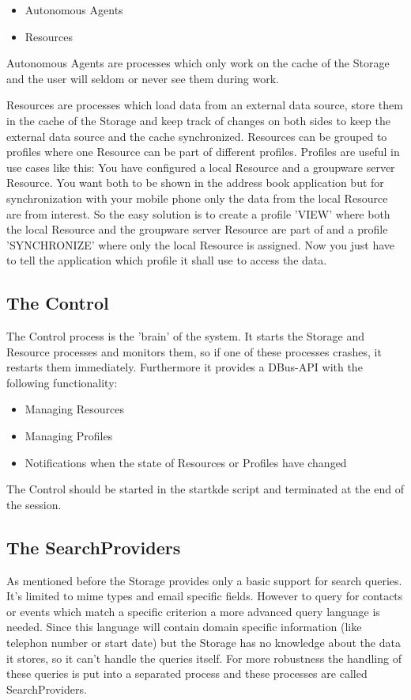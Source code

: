 \documentclass[]{report}
\begin{document}
\begin{itemize}
  \item Autonomous Agents
  \item Resources
\end{itemize}

Autonomous Agents are processes which only work on the cache of the Storage
and the user will seldom or never see them during work.

Resources are processes which load data from an external data source, store them
in the cache of the Storage and keep track of changes on both sides to keep
the external data source and the cache synchronized.
Resources can be grouped to profiles where one Resource can be part of different
profiles. Profiles are useful in use cases like this:
You have configured a local Resource and a groupware server Resource. You want both
to be shown in the address book application but for synchronization with your mobile
phone only the data from the local Resource are from interest. So the easy solution
is to create a profile 'VIEW' where both the local Resource and the groupware server
Resource are part of and a profile 'SYNCHRONIZE' where only the local Resource is
assigned. Now you just have to tell the application which profile it shall use to
access the data.

\subsection{The Control}
The Control process is the 'brain' of the system. It starts the Storage and Resource
processes and monitors them, so if one of these processes crashes, it restarts them immediately.
Furthermore it provides a DBus-API with the following functionality:

\begin{itemize}
  \item Managing Resources
  \item Managing Profiles
  \item Notifications when the state of Resources or Profiles have changed
\end{itemize}

The Control should be started in the startkde script and terminated at the end of the session.

\subsection{The SearchProviders}
As mentioned before the Storage provides only a basic support for search queries. It's limited
to mime types and email specific fields. However to query for contacts or events which match
a specific criterion a more advanced query language is needed. Since this language will contain
domain specific information (like telephon number or start date) but the Storage has no knowledge
about the data it stores, so it can't handle the queries itself.
For more robustness the handling of these queries is put into a separated process and these processes
are called SearchProviders.
\end{document}
